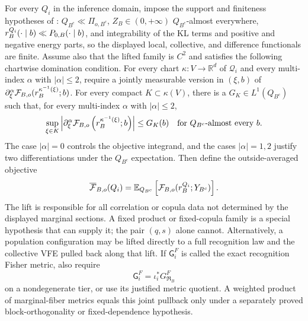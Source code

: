 For every $Q_i$ in the inference domain, impose the support and finiteness
hypotheses of :
$Q_{B^c}\ll\Pi_{o,B^c}$,
$Z_B\in(0,+\infty)$ $Q_{B^c}$-almost everywhere,
$r_B^{Q_i}(\cdot\mid b)\ll P_{0,B}(\cdot\mid b)$, and integrability of the
KL terms and positive and negative energy parts, so the displayed local,
collective, and difference functionals are finite.  Assume also that the
lifted family is $C^2$ and satisfies the following chartwise domination
condition.  For every chart $\kappa:V\to\mathbb R^d$ of $\mathcal Q_i$ and
every multi-index $\alpha$ with $|\alpha|\leq2$, require a jointly measurable
version in $(\xi,b)$ of
$\partial_\xi^\alpha
\mathcal F_{B,o}(r_B^{\kappa^{-1}(\xi)};b)$.
For every compact $K\subset\kappa(V)$, there is a
$G_K\in L^1(Q_{B^c})$ such that, for every multi-index $\alpha$ with
$|\alpha|\leq2$,
\begin{equation}
\sup_{\xi\in K}
\left|
\partial_\xi^\alpha
\mathcal F_{B,o}
\left(r_B^{\kappa^{-1}(\xi)};b\right)
\right|
\leq G_K(b)
\quad\text{for }Q_{B^c}\text{-almost every }b.
\label{eq:hist-chartwise-vfe-envelope}
\end{equation}
The case $|\alpha|=0$ controls the objective integrand, and the cases
$|\alpha|=1,2$ justify two differentiations under the $Q_{B^c}$ expectation.
Then define the outside-averaged objective
\begin{equation}
\overline{\mathcal F}_{B,o}(Q_i)
=\mathbb E_{Q_{B^c}}
\left[\mathcal F_{B,o}
(r_B^{Q_i};Y_{B^c})\right].
\label{eq:hist-outside-averaged-local-vfe}
\end{equation}
The lift is responsible for all correlation or copula data not determined by
the displayed marginal sections.  A fixed product or fixed-copula family is a
special hypothesis that can supply it; the pair $(q,s)$ alone cannot.
Alternatively, a population configuration may be lifted directly to a full
recognition law and the collective VFE pulled back along that lift.
If $\mathsf G_i^F$ is called the exact recognition Fisher metric, also require
\begin{equation}
\mathsf G_i^F=\iota_i^*G_{\mathfrak R_B}^F
\label{eq:hist-exact-fisher-lift}
\end{equation}
on a nondegenerate tier, or use its justified metric quotient.  A weighted
product of marginal-fiber metrics equals this joint pullback only under a
separately proved block-orthogonality or fixed-dependence hypothesis.


